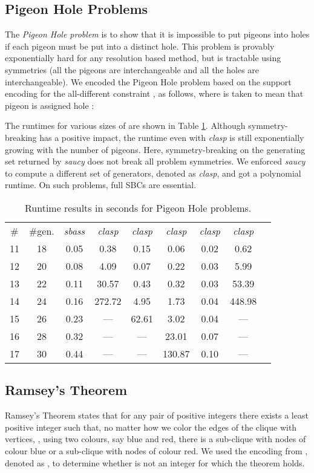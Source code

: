 \documentclass[envcountsame]{llncs}
\newcommand{\systemname}[1]{\emph{#1}}
\begin{document}
\subsection{Pigeon Hole Problems}
The \emph{Pigeon Hole problem} is to show that it is impossible to put  pigeons into  holes if each pigeon must be put into a distinct hole. This problem is provably exponentially hard for any resolution based method, but is tractable using symmetries (all the pigeons are interchangeable and all the holes are interchangeable). We encoded the Pigeon Hole problem based on the support encoding for the all-different constraint \cite{drwa10a}, as follows, where  is taken to mean that pigeon  is assigned hole :

The runtimes for various sizes of  are shown in Table \ref{tab:php}. Although symmetry-breaking has a positive impact, the runtime even with \systemname{clasp} is still exponentially growing with the number of pigeons. Here, symmetry-breaking on the generating set returned by \systemname{saucy} does not break all problem symmetries. We enforced \systemname{saucy} to compute a different set of generators, denoted as \systemname{clasp}, and got a polynomial runtime.
On such problems, full SBCs are essential.
\begin{table}
\caption{Runtime results in seconds for Pigeon Hole problems. \label{tab:php}}
\centering
\begin{tabular}{ccccccccc}
\hline\noalign{\smallskip}
\#&\#gen.& \systemname{sbass} & \systemname{clasp} & \systemname{clasp} & \systemname{clasp} & \systemname{clasp} & \systemname{clasp}\\  
\noalign{\smallskip}
\hline
\noalign{\smallskip}
11 & 18 & 0.05 &  0.38 &  0.15 &  0.06 & 0.02 &  0.62 \\
12 & 20 & 0.08 &  4.09 &  0.07 &  0.22 & 0.03 &  5.99 \\
13 & 22 & 0.11 & 30.57 &  0.43 &  0.32 & 0.03 & 53.39 \\
14 & 24 & 0.16 &272.72 &  4.95 &  1.73 & 0.04 &448.98 \\
15 & 26 & 0.23 & ---   & 62.61 &  3.02 & 0.04 & ---   \\
16 & 28 & 0.32 & ---   & ---   & 23.01 & 0.07 & ---   \\
17 & 30 & 0.44 & ---   & ---   &130.87 & 0.10 & ---   \\
\hline
\end{tabular}
\end{table}

\subsection{Ramsey's Theorem}
Ramsey's Theorem states that for any pair of positive integers  there exists a least positive integer  such that, no matter how we color the edges of the clique with  vertices, , using two colours, say blue and red, there is a sub-clique with  nodes of colour blue or a sub-clique with  nodes of colour red. We used the encoding from \cite{lepffaeigopesc02a}, denoted as , to determine whether  is not an integer for which the theorem holds.
\end{document}
